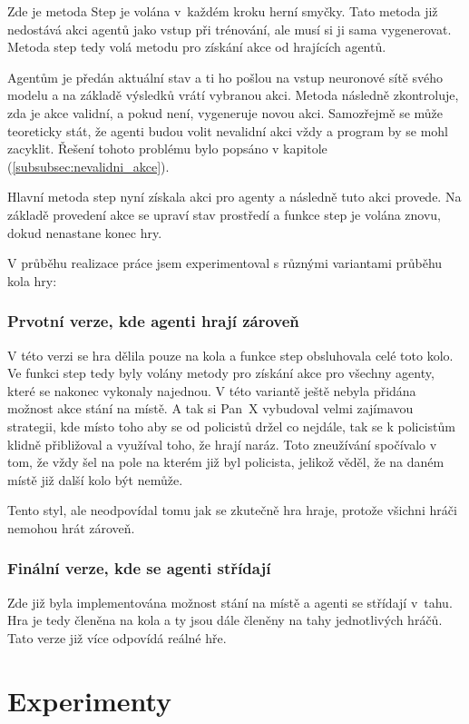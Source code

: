 Zde je metoda Step je volána v~každém kroku  herní smyčky.
Tato metoda již nedostává akci agentů jako vstup při trénování, ale musí si ji sama vygenerovat.
Metoda step tedy volá metodu pro získání akce od hrajících agentů.

Agentům je předán aktuální stav a ti ho pošlou na vstup neuronové sítě svého modelu a na základě výsledků vrátí vybranou akci.
Metoda následně zkontroluje, zda je akce validní, a pokud není, vygeneruje novou akci.
Samozřejmě se může teoreticky stát, že agenti budou volit nevalidní akci vždy a program by se mohl zacyklit.
Řešení tohoto problému bylo popsáno v kapitole  (\ref{subsubsec:nevalidni_akce}).

Hlavní metoda step nyní získala akci pro agenty a následně tuto akci provede.
Na základě provedení akce se upraví stav prostředí a funkce step je volána znovu, dokud nenastane konec hry.

\pagebreak

V průběhu realizace práce jsem experimentoval s různými variantami průběhu kola hry:
\subsection{Prvotní verze, kde agenti hrají zároveň}
V této verzi se hra dělila pouze na kola a funkce step obsluhovala celé toto kolo.
Ve funkci step tedy byly volány metody pro získání akce pro všechny agenty, které se nakonec vykonaly najednou.
V této variantě ještě nebyla přidána možnost akce stání na místě.
A tak si Pan~X vybudoval velmi zajímavou strategii, kde místo toho aby se od policistů držel co nejdále, tak se k policistům klidně přibližoval a využíval toho, že hrají naráz.
Toto zneužívání spočívalo v tom, že vždy šel na pole na kterém již byl policista, jelikož věděl, že na daném místě již další kolo být nemůže.

Tento styl, ale neodpovídal tomu jak se zkutečně hra hraje, protože všichni hráči nemohou hrát zároveň.
\subsection{Finální verze, kde se agenti střídají}
Zde již byla implementována možnost stání na místě a agenti se střídají v~tahu.
Hra je tedy členěna na kola a ty jsou dále členěny na tahy jednotlivých hráčů.
Tato verze již více odpovídá reálné hře.

\chapter{Experimenty}
\label{ch:experimenty}

